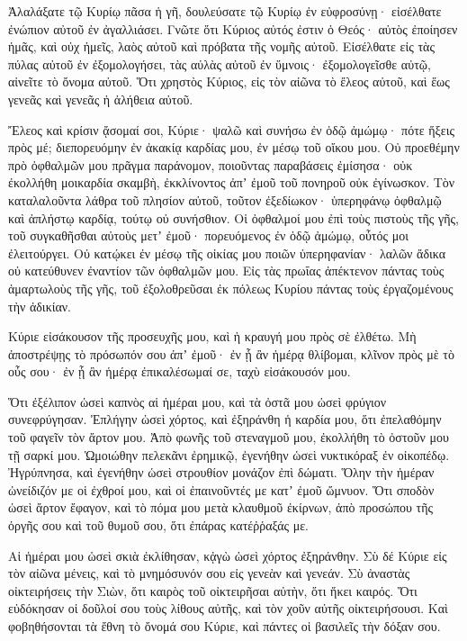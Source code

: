 \begin{spacing}{1.1}
\begin{multicols}{2}
Ἀλαλάξατε τῷ Κυρίῳ πᾶσα ἡ γῆ,
δουλεύσατε τῷ Κυρίῳ ἐν εὐφροσύνῃ· εἰσέλθατε ἐνώπιον αὐτοῦ ἐν ἀγαλλιάσει.
Γνῶτε ὅτι Κύριος αὐτός ἐστιν ὁ Θεός· αὐτὸς ἐποίησεν ἡμᾶς, καὶ οὐχ ἡμεῖς, λαὸς αὐτοῦ καὶ πρόβατα τῆς νομῆς αὐτοῦ.
Εἰσέλθατε εἰς τὰς πύλας αὐτοῦ ἐν ἐξομολογήσει, τὰς αὐλὰς αὐτοῦ ἐν ὕμνοις· ἐξομολογεῖσθε αὐτῷ, αἰνεῖτε τὸ ὄνομα αὐτοῦ.
Ὅτι χρηστὸς Κύριος, εἰς τὸν αἰῶνα τὸ ἔλεος αὐτοῦ, καὶ ἕως γενεᾶς καὶ γενεᾶς ἡ ἀλήθεια αὐτοῦ.

Ἔλεος καὶ κρίσιν ᾄσομαί σοι, Κύριε·
ψαλῶ καὶ συνήσω ἐν ὁδῷ ἀμώμῳ· πότε ἥξεις πρὸς μέ; διεπορευόμην ἐν ἀκακίᾳ καρδίας μου, ἐν μέσῳ τοῦ οἴκου μου.
Οὐ προεθέμην πρὸ ὀφθαλμῶν μου πρᾶγμα παράνομον, ποιοῦντας παραβάσεις ἐμίσησα· οὐκ ἐκολλήθη μοικαρδία σκαμβὴ,
ἐκκλίνοντος ἀπʼ ἐμοῦ τοῦ πονηροῦ οὐκ ἐγίνωσκον.
Τὸν καταλαλοῦντα λάθρα τοῦ πλησίον αὐτοῦ, τοῦτον ἐξεδίωκον· ὑπερηφάνῳ ὀφθαλμῷ καὶ ἀπλήστῳ καρδίᾳ, τούτῳ οὐ συνήσθιον.
Οἱ ὀφθαλμοί μου ἐπὶ τοὺς πιστοὺς τῆς γῆς, τοῦ συγκαθῆσθαι αὐτοὺς μετʼ ἐμοῦ· πορευόμενος ἐν ὁδῷ ἀμώμῳ, οὗτός μοι ἐλειτούργει.
Οὐ κατῴκει ἐν μέσῳ τῆς οἰκίας μου ποιῶν ὑπερηφανίαν· λαλῶν ἄδικα οὐ κατεύθυνεν ἐναντίον τῶν ὀφθαλμῶν μου.
Εἰς τὰς πρωΐας ἀπέκτενον πάντας τοὺς ἁμαρτωλοὺς τῆς γῆς, τοῦ ἐξολοθρεῦσαι ἐκ πόλεως Κυρίου πάντας τοὺς ἐργαζομένους τὴν ἀδικίαν.

Κύριε εἰσάκουσον τῆς προσευχῆς μου, καὶ ἡ κραυγή μου πρὸς σὲ ἐλθέτω.
Μὴ ἀποστρέψῃς τὸ πρόσωπόν σου ἀπʼ ἐμοῦ· ἐν ᾗ ἂν ἡμέρᾳ θλίβομαι, κλῖνον πρὸς μὲ τὸ οὖς σου· ἐν ᾗ ἂν ἡμέρᾳ ἐπικαλέσωμαί σε, ταχὺ εἰσάκουσόν μου.

Ὅτι ἐξέλιπον ὡσεὶ καπνὸς αἱ ἡμέραι μου, καὶ τὰ ὀστᾶ μου ὡσεὶ φρύγιον συνεφρύγησαν.
Ἐπλήγην ὡσεὶ χόρτος, καὶ ἐξηράνθη ἡ καρδία μου, ὅτι ἐπελαθόμην τοῦ φαγεῖν τὸν ἄρτον μου.
Ἀπὸ φωνῆς τοῦ στεναγμοῦ μου, ἐκολλήθη τὸ ὀστοῦν μου τῇ σαρκί μου.
Ὡμοιώθην πελεκᾶνι ἐρημικῷ, ἐγενήθην ὡσεὶ νυκτικόραξ ἐν οἰκοπέδῳ.
Ἠγρύπνησα, καὶ ἐγενήθην ὡσεὶ στρουθίον μονάζον ἐπὶ δώματι.
Ὅλην τὴν ἡμέραν ὠνείδιζόν με οἱ ἐχθροί μου, καὶ οἱ ἐπαινοῦντές με κατʼ ἐμοῦ ὤμνυον.
Ὅτι σποδὸν ὡσεὶ ἄρτον ἔφαγον, καὶ τὸ πόμα μου μετὰ κλαυθμοῦ ἐκίρνων,
ἀπὸ προσώπου τῆς ὀργῆς σου καὶ τοῦ θυμοῦ σου, ὅτι ἐπάρας κατέῤῥαξάς με.

Αἱ ἡμέραι μου ὡσεὶ σκιὰ ἐκλίθησαν, κᾀγὼ ὡσεὶ χόρτος ἐξηράνθην.
Σὺ δέ Κύριε εἰς τὸν αἰῶνα μένεις, καὶ τὸ μνημόσυνόν σου εἰς γενεὰν καὶ γενεάν.
Σὺ ἀναστὰς οἰκτειρήσεις τὴν Σιὼν, ὅτι καιρὸς τοῦ οἰκτειρῆσαι αὐτὴν, ὅτι ἥκει καιρός.
Ὅτι εὐδόκησαν οἱ δοῦλοί σου τοὺς λίθους αὐτῆς, καὶ τὸν χοῦν αὐτῆς οἰκτειρήσουσι.
Καὶ φοβηθήσονται τὰ ἔθνη τὸ ὄνομά σου Κύριε, καὶ πάντες οἱ βασιλεῖς τὴν δόξαν σου.


\end{multicols}
\end{spacing}
